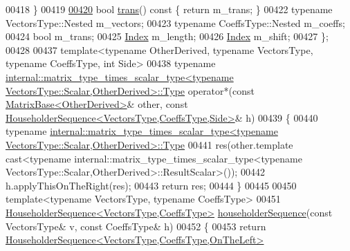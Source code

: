 \begin{DoxyCode}
00418     \}
00419 
\hyperlink{group___householder___module_ad61c9b10d95c26b7397ccb47f4d80b08}{00420}     \textcolor{keywordtype}{bool} \hyperlink{group___householder___module_ad61c9b10d95c26b7397ccb47f4d80b08}{trans}()\textcolor{keyword}{ const }\{ \textcolor{keywordflow}{return} m\_trans; \}     
00422     \textcolor{keyword}{typename} VectorsType::Nested m\_vectors;
00423     \textcolor{keyword}{typename} CoeffsType::Nested m\_coeffs;
00424     \textcolor{keywordtype}{bool} m\_trans;
00425     \hyperlink{group___core___module_a554f30542cc2316add4b1ea0a492ff02}{Index} m\_length;
00426     \hyperlink{group___core___module_a554f30542cc2316add4b1ea0a492ff02}{Index} m\_shift;
00427 \};
00428 
00437 \textcolor{keyword}{template}<\textcolor{keyword}{typename} OtherDerived, \textcolor{keyword}{typename} VectorsType, \textcolor{keyword}{typename} CoeffsType, \textcolor{keywordtype}{int} S\textcolor{keywordtype}{id}e>
00438 \textcolor{keyword}{typename} 
      \hyperlink{group___core___module_class_eigen_1_1_matrix}{internal::matrix\_type\_times\_scalar\_type<typename VectorsType::Scalar,OtherDerived>::Type}
       operator*(\textcolor{keyword}{const} \hyperlink{group___core___module_class_eigen_1_1_matrix_base}{MatrixBase<OtherDerived>}& other, \textcolor{keyword}{const} 
      \hyperlink{group___householder___module_class_eigen_1_1_householder_sequence}{HouseholderSequence<VectorsType,CoeffsType,Side>}& h)
00439 \{
00440   \textcolor{keyword}{typename} 
      \hyperlink{group___core___module_class_eigen_1_1_matrix}{internal::matrix\_type\_times\_scalar\_type<typename VectorsType::Scalar,OtherDerived>::Type}
00441     res(other.template cast<\textcolor{keyword}{typename} internal::matrix\_type\_times\_scalar\_type<typename
       VectorsType::Scalar,OtherDerived>::ResultScalar>());
00442   h.applyThisOnTheRight(res);
00443   \textcolor{keywordflow}{return} res;
00444 \}
00445 
00450 \textcolor{keyword}{template}<\textcolor{keyword}{typename} VectorsType, \textcolor{keyword}{typename} CoeffsType>
00451 \hyperlink{group___householder___module_class_eigen_1_1_householder_sequence}{HouseholderSequence<VectorsType,CoeffsType>} 
      \hyperlink{group___householder___module_ga4bd4b85120e014cf1125a054b02d4d92}{householderSequence}(\textcolor{keyword}{const} VectorsType& v, \textcolor{keyword}{const} CoeffsType& h)
00452 \{
00453   \textcolor{keywordflow}{return} \hyperlink{group___householder___module_class_eigen_1_1_householder_sequence}{HouseholderSequence<VectorsType,CoeffsType,OnTheLeft>}

\end{DoxyCode}
